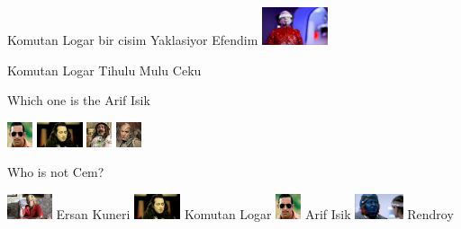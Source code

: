 \documentclass{exam}
\begin{document}
\begin{questions}
\question Komutan Logar bir cisim Yaklasiyor Efendim\newline
\includegraphics[height=3em]{tihulu.jpeg} \newline
\begin{oneparchoices}
\choice Komutan Logar
\choice Tihulu
\choice Mulu
\choice Ceku
\end{oneparchoices}
\question Which one is the Arif Isik\newline
\begin{oneparchoices}
\choice \includegraphics[height=2em]{arifisik.jpg}
\choice \includegraphics[height=2em]{komutanlogar.jpeg}
\choice \includegraphics[height=2em]{faruk.jpg}
\choice \includegraphics[height=2em]{216.jpg}
\end{oneparchoices}
\question Who is not Cem?\newline
\begin{oneparchoices}
\choice \includegraphics[height=2em]{ersan.jpg}
Ersan Kuneri
\choice \includegraphics[height=2em]{komutanlogar.jpeg}
Komutan Logar
\choice \includegraphics[height=2em]{arifisik.jpg}
Arif Isik
\choice \includegraphics[height=2em]{rendroy2.jpg}
Rendroy
\end{oneparchoices}

\end{questions}
\end{document}
